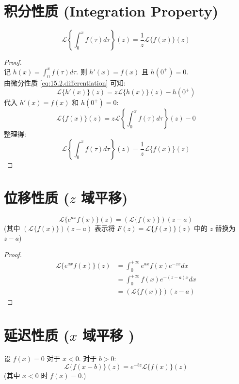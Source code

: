 \documentclass[linespread=1.5,openany]{book}%
\def\diff{d}%
\theoremstyle{plain}
\newcommand{\diff}{\mathop{}\!\mathrm{d}}  %
\begin{document}
{{{					\section{积分性质 (Integration Property)} %
					{ %
						\begin{equation} \label{eq:15.3.integration}
							\mathcal{L}\left\{\int_{0}^{x} f(\tau) \diff \tau\right\}(z) = \frac{1}{z} \mathcal{L}\{f(x)\}(z)
						\end{equation}
						\begin{proof}~\\[8pt]
							记 $h(x) = \int_{0}^{x} f(\tau) \diff \tau$. 则 $h'(x) = f(x)$ 且 $h(0^+) = 0$. \\[8pt]
							由微分性质 \eqref{eq:15.2.differentiation} 可知: %
							\[ \mathcal{L}\{h'(x)\}(z) = z\mathcal{L}\{h(x)\}(z) - h(0^+) \]
							代入 $h'(x)=f(x)$ 和 $h(0^+)=0$:
							\[ \mathcal{L}\{f(x)\}(z) = z\mathcal{L}\left\{\int_{0}^{x} f(\tau) \diff \tau\right\}(z) - 0 \]
							整理得:
							\[ \mathcal{L}\left\{\int_{0}^{x} f(\tau) \diff \tau\right\}(z) = \frac{1}{z} \mathcal{L}\{f(x)\}(z) \]
						\end{proof}
					} %
					
					\section{位移性质 ($z$ 域平移)} %
					{ %
						\begin{equation} \label{eq:15.4.z_shifting}
							\mathcal{L}\{e^{ax}f(x)\}(z) = (\mathcal{L}\{f(x)\})(z-a)
						\end{equation}
						(其中 $(\mathcal{L}\{f(x)\})(z-a)$ 表示将 $F(z) = \mathcal{L}\{f(x)\}(z)$ 中的 $z$ 替换为 $z-a$)
						\begin{proof}
							\begin{align*}
								\mathcal{L}\{e^{ax}f(x)\}(z) &= \int_{0}^{+\infty} e^{ax}f(x) e^{-zx} \diff x \\[6pt]
								&= \int_{0}^{+\infty} f(x) e^{-(z-a)x} \diff x \\[6pt]
								&=(\mathcal{L}\{f(x)\})(z-a)
							\end{align*}
						\end{proof}
					} %
					
					\section{延迟性质 ($x$ 域平移 )} %
					{ %
						设 $f(x)=0$ 对于 $x<0$. 对于 $b>0$:
						\begin{equation} \label{eq:15.5.x_shifting}
							\mathcal{L}\{f(x-b)\}(z) = e^{-bz} \mathcal{L}\{f(x)\}(z)
						\end{equation}
						(其中  $x<0$ 时 $f(x)=0$.)
						
}}}}
\end{document}

